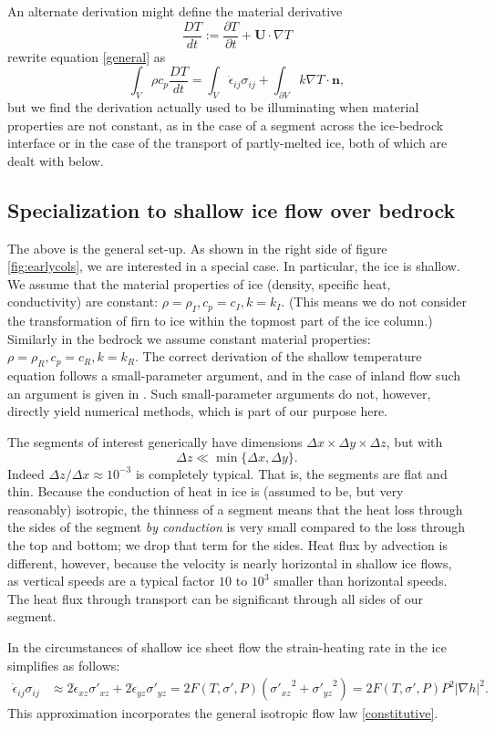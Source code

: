 \documentclass[12pt,final]{amsart}%
\theoremstyle{plain}
\theoremstyle{definition}
\theoremstyle{remark}
\newcommand{\ddt}[1]{\ensuremath{\frac{\partial #1}{\partial t}}}
\def\eps{\epsilon}
\newcommand{\grad}{\nabla}
\newcommand{\nhat}{\mathbf{n}}
\newcommand{\bU}{{\mathbf{U}}}
\begin{document}
An alternate derivation might define the material derivative
    $$\frac{D T}{dt} := \ddt{T} + \bU\cdot \grad T$$
rewrite equation \eqref{general} as
    $$\int_V \rho c_p \frac{D T}{dt} = \int_V \dot \eps_{ij} \sigma_{ij} + \int_{\partial V} k \grad T \cdot \nhat,$$
but we find the derivation actually used to be illuminating when material properties are not constant, as in the case of a segment across the ice-bedrock interface or in the case of the transport of partly-melted ice, both of which are dealt with below.


\subsection*{Specialization to shallow ice flow over bedrock}  The above is the general set-up.  As shown in the right side of figure \ref{fig:earlycols}, we are interested in a special case.  In particular, the ice is shallow.  We assume that the material properties of ice (density, specific heat, conductivity) are constant: $\rho=\rho_I,c_p=c_I,k=k_I$.  (This means we do not consider the transformation of firn to ice within the topmost part of the ice column.)  Similarly in the bedrock we assume constant material properties: $\rho=\rho_R,c_p=c_R,k =k_R$.  The correct derivation of the shallow temperature equation follows a small-parameter argument, and in the case of inland flow such an argument is given in \citep{Fowler}.  Such small-parameter arguments do not, however, directly yield numerical methods, which is part of our purpose here.

The segments of interest generically have dimensions $\Delta x \times \Delta y \times \Delta z$, but with
    $$\Delta z \ll \min\{\Delta x, \Delta y\}.$$
Indeed $\Delta z / \Delta x \approx 10^{-3}$ is completely typical.  That is, the segments are flat and thin.  Because the conduction of heat in ice is (assumed to be, but very reasonably) isotropic, the thinness of a segment means that the heat loss through the sides of the segment \emph{by conduction} is very small compared to the loss through the top and bottom; we drop that term for the sides.  Heat flux by advection is different, however, because the velocity is nearly horizontal in shallow ice flows, as vertical speeds are a typical factor $10$ to $10^3$ smaller than horizontal speeds.  The heat flux through transport can be significant through all sides of our segment.

In the circumstances of shallow ice sheet flow \citep{Fowler} the strain-heating rate in the ice simplifies as follows:
\begin{align}\label{strainheatingSIA}
\dot\eps_{ij}\sigma_{ij} &\approx 2\dot\eps_{xz}\sigma'_{xz} + 2\dot\eps_{yz}\sigma'_{yz} = 2 F(T,\sigma',P) \left({\sigma'_{xz}}^2 + {\sigma'_{yz}}^2\right) = 2 F(T,\sigma',P) P^2 |\grad h|^2.
\end{align}
This approximation incorporates the general isotropic flow law \eqref{constitutive}.
\end{document}
